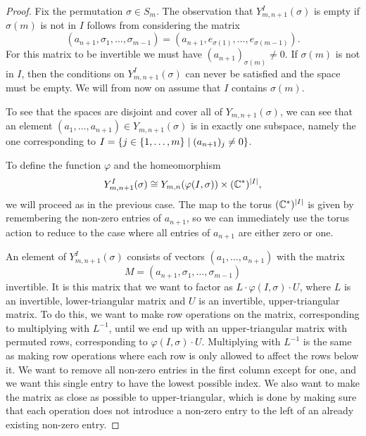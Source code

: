 \begin{proof}
  Fix the permutation $\sigma \in S_m$. The observation that
  $Y^I_{m,n+1}(\sigma)$ is empty 
  if $\sigma(m)$ is not in $I$ follows from considering the matrix
  \[ (a_{n+1},\sigma_1,\dots,\sigma_{m-1}) =
  (a_{n+1},e_{\sigma(1)},\dots,e_{\sigma(m-1)}). \]
  For this matrix to be invertible we must have $(a_{n+1})_{\sigma(m)}
  \neq 0$. If $\sigma(m)$ is not in $I$, then the conditions on
  $Y^{I}_{m,n+1}(\sigma)$ can never be satisfied and the space must be
  empty. We will from now on assume that $I$ contains $\sigma(m)$.
  
  To see that the spaces are disjoint and cover all of
  $Y_{m,n+1}(\sigma)$, we can see that an element
  $(a_1,\dots,a_{n+1})\in Y_{m,n+1}(\sigma)$ is in exactly one
  subspace, namely the one corresponding to $I = \left\{  j \in
    \left\{ 1,\dots,m \right\} \mid (a_{n+1})_j \neq 0 \right\}$.
  
  To define the function $\varphi$ and the homeomorphism
  \[ Y^I_{m,n+1}(\sigma) \cong Y_{m,n}(\varphi(I,\sigma))\times
  (\mathbb{C}^*)^{\left| I \right|}, \]
  we will proceed as in the previous case. The map to the torus
  $(\mathbb{C}^*)^{\left| I \right|}$ is given by remembering the non-zero entries of
  $a_{n+1}$, so we can immediately use the torus action to reduce to
  the case where all
  entries of $a_{n+1}$ are either zero or one.

  An element of $Y_{m,n+1}^I(\sigma)$ consists of vectors
  $(a_1,\dots,a_{n+1})$ with the matrix
  \[ M = (a_{n+1},\sigma_1,\dots,\sigma_{m-1}) \]
  invertible. It is this matrix that we want to factor as
  $L\cdot \varphi(I,\sigma)\cdot U$, where $L$ is an invertible,
  lower-triangular matrix and $U$ is an invertible, upper-triangular
  matrix. To do this, we want to make row operations on the matrix,
  corresponding to multiplying with $L^{-1}$, until we end up with an
  upper-triangular matrix with permuted rows, corresponding to
  $\varphi(I,\sigma) \cdot U$. Multiplying with $L^{-1}$ is the same
  as making row operations where each row is only allowed to affect
  the rows below it. We want to remove all non-zero entries in the
  first column except for one, and we want this single entry to have
  the lowest possible index. We also want to make the matrix as close
  as possible to upper-triangular, which is done by making sure that
  each operation does not introduce a non-zero entry to the left of an
  already existing non-zero entry.
  

\end{proof}
